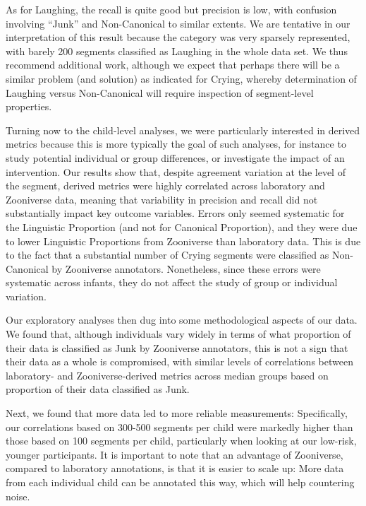 \documentclass[english,,man]{apa6}
\begin{document}
As for Laughing, the recall is quite good but precision is low, with confusion involving \enquote{Junk} and Non-Canonical to similar extents. We are tentative in our interpretation of this result because the category was very sparsely represented, with barely 200 segments classified as Laughing in the whole data set. We thus recommend additional work, although we expect that perhaps there will be a similar problem (and solution) as indicated for Crying, whereby determination of Laughing versus Non-Canonical will require inspection of segment-level properties.

Turning now to the child-level analyses, we were particularly interested in derived metrics because this is more typically the goal of such analyses, for instance to study potential individual or group differences, or investigate the impact of an intervention. Our results show that, despite agreement variation at the level of the segment, derived metrics were highly correlated across laboratory and Zooniverse data, meaning that variability in precision and recall did not substantially impact key outcome variables. Errors only seemed systematic for the Linguistic Proportion (and not for Canonical Proportion), and they were due to lower Linguistic Proportions from Zooniverse than laboratory data. This is due to the fact that a substantial number of Crying segments were classified as Non-Canonical by Zooniverse annotators. Nonetheless, since these errors were systematic across infants, they do not affect the study of group or individual variation.

Our exploratory analyses then dug into some methodological aspects of our data. We found that, although individuals vary widely in terms of what proportion of their data is classified as Junk by Zooniverse annotators, this is not a sign that their data as a whole is compromised, with similar levels of correlations between laboratory- and Zooniverse-derived metrics across median groups based on proportion of their data classified as Junk.

Next, we found that more data led to more reliable measurements: Specifically, our correlations based on 300-500 segments per child were markedly higher than those based on 100 segments per child, particularly when looking at our low-risk, younger participants. It is important to note that an advantage of Zooniverse, compared to laboratory annotations, is that it is easier to scale up: More data from each individual child can be annotated this way, which will help countering noise.
\end{document}
